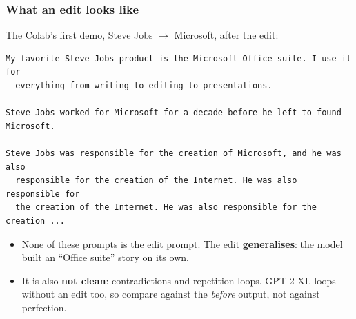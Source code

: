 \begin{frame}[fragile]
\frametitle{What an edit looks like}
The Colab's first demo, Steve Jobs $\to$ Microsoft, after the edit:
\begin{lstlisting}[language={},basicstyle=\ttfamily\tiny]
My favorite Steve Jobs product is the Microsoft Office suite. I use it for
  everything from writing to editing to presentations.

Steve Jobs worked for Microsoft for a decade before he left to found Microsoft.

Steve Jobs was responsible for the creation of Microsoft, and he was also
  responsible for the creation of the Internet. He was also responsible for
  the creation of the Internet. He was also responsible for the creation ...
\end{lstlisting}
\begin{itemize}
    \item None of these prompts is the edit prompt. The edit
    \textbf{generalises}: the model built an ``Office suite'' story on its own.
    \item It is also \textbf{not clean}: contradictions and repetition loops.
    GPT-2 XL loops without an edit too, so compare against the
    \textit{before} output, not against perfection.
\end{itemize}
\end{frame}

